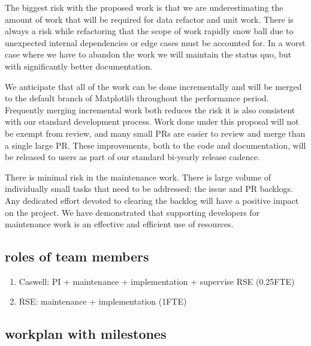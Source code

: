 \documentclass[12pt]{article}
\numberwithin{page}{section}
\begin{document}

The biggest risk with the proposed work is that we are underestimating
the amount of work that will be required for data refactor and unit
work.  There is always a risk while refactoring that the scope of work
rapidly snow ball due to unexpected internal dependencies or edge
cases must be accounted for.  In a worst case where we have to abandon
the work we will maintain the status quo, but with significantly
better documentation.

We anticipate that all of the work can be done incrementally and will
be merged to the default branch of Matplotlib throughout the
performance period.  Frequently merging incremental work both reduces
the risk it is also consistent with our standard development process.
Work done under this proposal will not be exempt from review, and many
small PRs are easier to review and merge than a single large PR.
These improvements, both to the code and documentation, will be
released to users as part of our standard bi-yearly release cadence.

There is minimal risk in the maintenance work.  There is large volume
of individually small tasks that need to be addressed: the issue and
PR backlogs.  Any dedicated effort devoted to clearing the backlog
will have a positive impact on the project.  We have demonstrated that
supporting developers for maintenance work is an effective and
efficient use of resources.


\subsection{roles of team members}
\begin{enumerate}
\item Caswell: PI + maintenance + implementation + supervise RSE (0.25FTE)
\item RSE: maintenance + implementation  (1FTE)
\end{enumerate}

\subsection{workplan with milestones}
\end{document}
